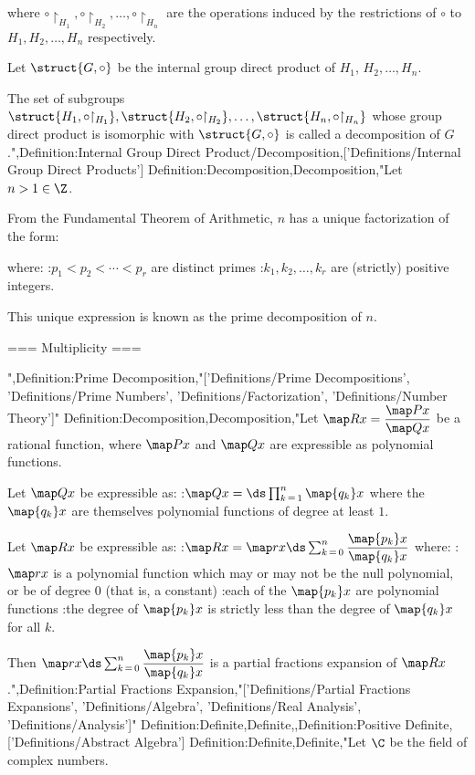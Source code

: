 where $\circ {\restriction_{H_1} }, \circ {\restriction_{H_2} }, \ldots, \circ {\restriction_{H_n} }$ are the operations induced by the restrictions of $\circ$ to $H_1, H_2, \ldots, H_n$ respectively.

Let $\struct {G, \circ}$ be the internal group direct product of $H_1$, $H_2, \ldots, H_n$.


The set of subgroups $\struct {H_1, \circ {\restriction_{H_1} } }, \struct {H_2, \circ {\restriction_{H_2} } }, \ldots, \struct {H_n, \circ {\restriction_{H_n} } }$ whose group direct product is isomorphic with $\struct {G, \circ}$ is called a decomposition of $G$.",Definition:Internal Group Direct Product/Decomposition,['Definitions/Internal Group Direct Products']
Definition:Decomposition,Decomposition,"Let $n > 1 \in \Z$.


From the Fundamental Theorem of Arithmetic, $n$ has a unique factorization of the form:






where:
:$p_1 < p_2 < \cdots < p_r$ are distinct primes
:$k_1, k_2, \ldots, k_r$ are (strictly) positive integers.


This unique expression is known as the prime decomposition of $n$.


=== Multiplicity ===

",Definition:Prime Decomposition,"['Definitions/Prime Decompositions', 'Definitions/Prime Numbers', 'Definitions/Factorization', 'Definitions/Number Theory']"
Definition:Decomposition,Decomposition,"Let $\map R x = \dfrac {\map P x} {\map Q x}$ be a rational function, where $\map P x$ and $\map Q x$ are expressible as polynomial functions.

Let $\map Q x$ be expressible as:
:$\map Q x = \ds \prod_{k \mathop = 1}^n \map {q_k} x$
where the $\map {q_k} x$ are themselves polynomial functions of degree at least $1$.


Let $\map R x$ be expressible as:
:$\map R x = \map r x \ds \sum_{k \mathop = 0}^n \dfrac {\map {p_k} x} {\map {q_k} x}$
where:
:$\map r x$ is a polynomial function which may or may not be the null polynomial, or be of degree $0$ (that is, a constant)
:each of the $\map {p_k} x$ are polynomial functions
:the degree of $\map {p_k} x$ is strictly less than the degree of $\map {q_k} x$ for all $k$.


Then $\map r x \ds \sum_{k \mathop = 0}^n \dfrac {\map {p_k} x} {\map {q_k} x}$ is a partial fractions expansion of $\map R x$.",Definition:Partial Fractions Expansion,"['Definitions/Partial Fractions Expansions', 'Definitions/Algebra', 'Definitions/Real Analysis', 'Definitions/Analysis']"
Definition:Definite,Definite,,Definition:Positive Definite,['Definitions/Abstract Algebra']
Definition:Definite,Definite,"Let $\C$ be the field of complex numbers.

